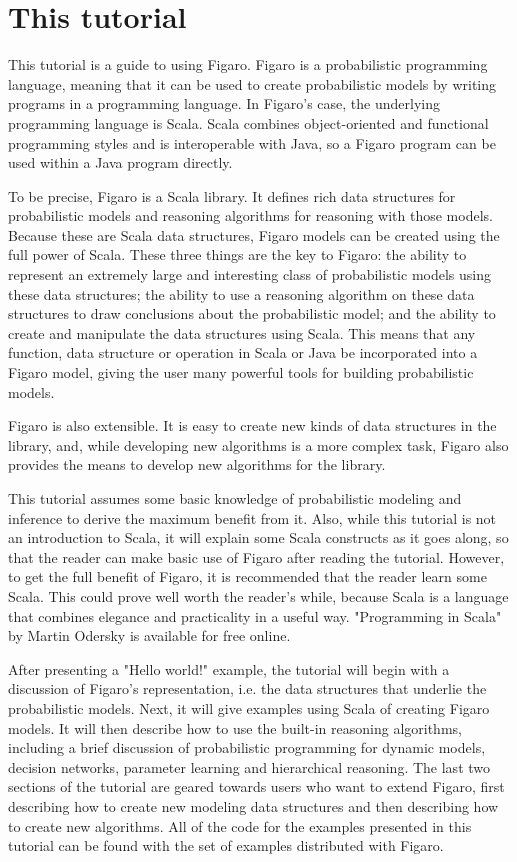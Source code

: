 
\section{This tutorial}

This tutorial is a guide to using Figaro. Figaro is a probabilistic programming language, meaning that it can be used to create probabilistic models by writing programs in a programming language. In Figaro's case, the underlying programming language is Scala. Scala combines object-oriented and functional programming styles and is interoperable with Java, so a Figaro program can be used within a Java program directly.

To be precise, Figaro is a Scala library. It defines rich data structures for probabilistic models and reasoning algorithms for reasoning with those models. Because these are Scala data structures, Figaro
models can be created using the full power of Scala. These three things are the key to Figaro: the ability to represent an extremely large and interesting class of probabilistic models using these data structures;
the ability to use a reasoning algorithm on these data structures to draw conclusions about the probabilistic model; and the ability to create and manipulate the data structures using Scala. This means that any function, data structure or operation in Scala or Java be incorporated into a Figaro model, giving
the user many powerful tools for building probabilistic models.

Figaro is also extensible. It is easy to create new kinds of data structures in the library, and, while developing new algorithms is a more complex task, Figaro also provides the means to develop new
algorithms for the library.

This tutorial assumes some basic knowledge of probabilistic modeling and inference to derive the maximum benefit from it. Also, while this tutorial is not an introduction to Scala, it will explain some Scala constructs as it goes along, so that the reader can make basic use of Figaro after reading the tutorial. However, to get the full benefit of Figaro, it is recommended that the reader learn some Scala. This could prove well worth the reader's while, because Scala is a language that combines elegance and practicality in a useful way. "Programming in Scala" by Martin Odersky is available for free online.

After presenting a "Hello world!" example, the tutorial will begin with a discussion of Figaro's representation, i.e. the data structures that underlie the probabilistic models. Next, it will give examples
using Scala of creating Figaro models. It will then describe how to use the built-in reasoning algorithms, including a brief discussion of probabilistic programming for dynamic models, decision networks,
parameter learning and hierarchical reasoning. The last two sections of the tutorial are geared towards users who want to extend Figaro, first describing how to create new modeling data structures and then describing how to create new algorithms. All of the code for the examples presented in this tutorial can be
found with the set of examples distributed with Figaro.



